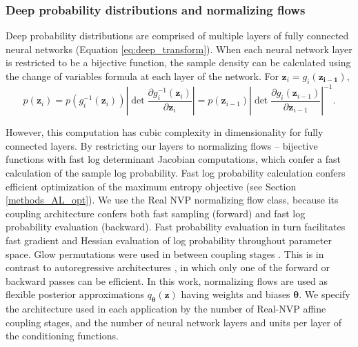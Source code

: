\documentclass[11pt]{article}
\begin{document}
\subsubsection{Deep probability distributions and normalizing flows}\label{methods_NF}
Deep probability distributions are comprised of multiple layers of fully connected neural networks (Equation \ref{eq:deep_transform}).
When each neural network layer is restricted to be a bijective function, the sample density can be calculated using the change of variables formula at each layer of the network.  For $\mathbf{z}_i = g_i(\mathbf{z_{i-1}})$,
\begin{equation}
p(\mathbf{z}_i) = p(g_i^{-1}(\mathbf{z}_i)) \left| \det \frac{\partial g_i^{-1}(\mathbf{z}_i)}{\partial \mathbf{z}_i} \right| = p(\mathbf{z}_{i-1}) \left| \det \frac{\partial g_i(\mathbf{z}_{i-1})}{\partial \mathbf{z}_{i-1}} \right|^{-1}.
\end{equation}

However, this computation has cubic complexity in dimensionality for fully connected layers.  
By restricting our layers to normalizing flows \cite{rezende2015variational, papamakarios2019normalizing} -- bijective functions with fast log determinant Jacobian computations, which confer a fast calculation of the sample log probability.
Fast log probability calculation confers efficient optimization of the maximum entropy objective (see Section \ref{methods_AL_opt}).
We use the Real NVP \cite{dinh2017density} normalizing flow class, because its coupling architecture confers both fast sampling (forward) and fast log probability evaluation (backward).
Fast probability evaluation in turn facilitates fast gradient and Hessian evaluation of log probability throughout parameter space.
Glow permutations were used in between coupling stages \cite{kingma2018glow}.
This is in contrast to autoregressive architectures \cite{papamakarios2017masked, kingma2016improved}, in which only one of the forward or backward passes can be efficient.
In this work, normalizing flows are used as flexible posterior approximations $q_{\bm{\theta}}(\mathbf{z})$ having weights and biases $\bm{\theta}$. 
We specify the architecture used in each application by the number of Real-NVP affine coupling stages, and the number of neural network layers and units per layer of the conditioning functions.
\end{document}
